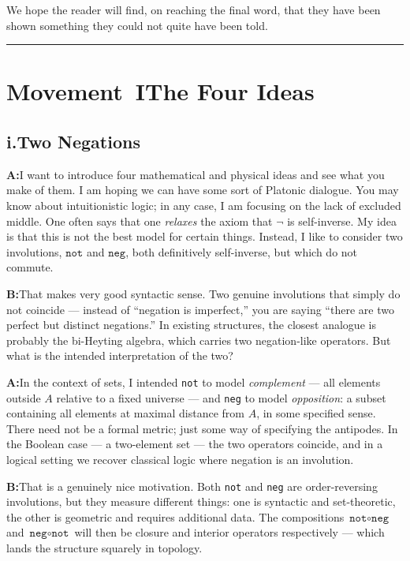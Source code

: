 \documentclass[11pt]{article}
\newcommand{\A}{\medskip\noindent\textbf{A:}\quad}
\newcommand{\B}{\medskip\noindent\textbf{B:}\quad}
\begin{document}
We hope the reader will find, on reaching the final word, that they have
been shown something they could not quite have been told.

\bigskip\rule{\textwidth}{0.4pt}\bigskip

\section*{Movement~I\quad The Four Ideas}

\subsection*{i.\enspace Two Negations}

\A I want to introduce four mathematical and physical ideas and see
what you make of them. I am hoping we can have some sort of Platonic
dialogue. You may know about intuitionistic logic; in any case, I am
focusing on the lack of excluded middle. One often says that one
\emph{relaxes} the axiom that $\neg$ is self-inverse. My idea is that
this is not the best model for certain things. Instead, I like to
consider two involutions, $\texttt{not}$ and $\texttt{neg}$, both
definitively self-inverse, but which do not commute.

\B That makes very good syntactic sense. Two genuine involutions that
simply do not coincide --- instead of ``negation is imperfect,'' you
are saying ``there are two perfect but distinct negations.'' In
existing structures, the closest analogue is probably the bi-Heyting
algebra, which carries two negation-like operators. But what is the
intended interpretation of the two?

\A In the context of sets, I intended \texttt{not} to model
\emph{complement} --- all elements outside $A$ relative to a fixed
universe --- and \texttt{neg} to model \emph{opposition}: a subset
containing all elements at maximal distance from $A$, in some
specified sense. There need not be a formal metric; just some way of
specifying the antipodes. In the Boolean case --- a two-element set
--- the two operators coincide, and in a logical setting we recover
classical logic where negation is an involution.

\B That is a genuinely nice motivation. Both \texttt{not} and
\texttt{neg} are order-reversing involutions, but they measure
different things: one is syntactic and set-theoretic, the other is
geometric and requires additional data. The compositions
$\texttt{not} \circ \texttt{neg}$ and $\texttt{neg} \circ \texttt{not}$
will then be closure and interior operators respectively --- which
lands the structure squarely in topology.
\end{document}
